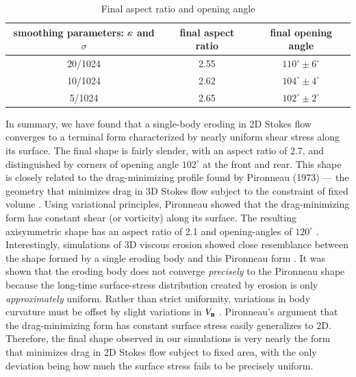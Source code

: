 \documentclass[preprint, 10pt]{elsarticle}
\begin{document}
\begin{table}%
\begin{center}
\caption{Final aspect ratio and opening angle
} 
\vspace{0.3 pc}
\label{table:arangle}
\begin{tabular}{c c c}
\hline
\hspace{0.5pc} smoothing parameters: $\varepsilon$ and $\sigma$
\hspace{0.5pc} & final aspect ratio 
\hspace{0.5pc} & final opening angle \\
\hline
20/1024		& 2.55	& $110^\circ \pm 6^\circ$	\\
10/1024		& 2.62	& $104^\circ \pm 4^\circ$	\\
5/1024		& 2.65	& $102^\circ \pm 2^\circ$	\\
\hline
\end{tabular}
\end{center}
\end{table}

	In summary, we have found that a single-body eroding in 2D Stokes flow converges to a terminal form characterized by nearly uniform shear stress along its surface. The final shape is fairly slender, with an aspect ratio of 2.7, and distinguished by  corners of opening angle $102^{\circ}$ at the front and rear. This shape is closely related to the drag-minimizing profile found by Pironneau (1973) --- the geometry that minimizes drag in 3D Stokes flow subject to the constraint of fixed volume \cite{pir1973}. Using variational principles, Pironneau showed that the drag-minimizing form has constant shear (or vorticity) along its surface. The resulting axisymmetric shape has an aspect ratio of 2.1 and opening-angles of $120^{\circ}$ \cite{pir1973, mit-spa2016}. Interestingly, simulations of 3D viscous erosion showed close resemblance between the shape formed by a single eroding body and this Pironneau form \cite{mit-spa2016}. It was shown that the eroding body does not converge {\em precisely} to the Pironneau shape because the long-time surface-stress distribution created by erosion is only {\em approximately} uniform. Rather than strict uniformity, variations in body curvature must be offset by slight variations in $V_{\mathbf{n}}$ \cite{pir1973, mit-spa2016}. Pironneau's argument that the drag-minimizing form has constant surface stress easily generalizes to 2D. Therefore, the final shape observed in our simulations is very nearly the form that minimizes drag in 2D Stokes flow subject to fixed area, with the only deviation being how much the surface stress fails to be precisely uniform.
\end{document}
